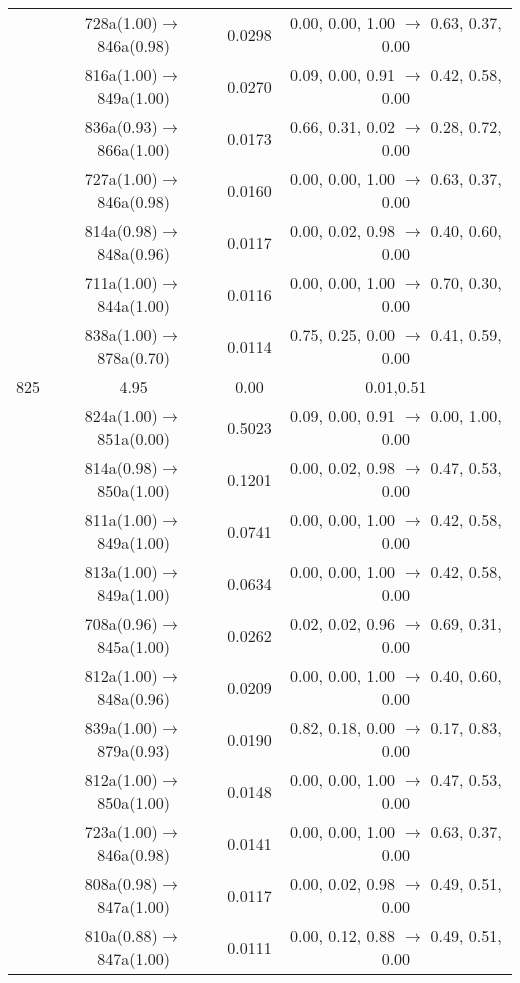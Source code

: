 \documentclass[10pt,a4paper]{article}
\begin{document}
\begin{longtable}{c|c|c|c}
 	& 728a(1.00)$\rightarrow$846a(0.98) &	 0.0298 &	 0.00, 0.00, 1.00 $\rightarrow$ 0.63, 0.37, 0.00 \\ 
 	& 816a(1.00)$\rightarrow$849a(1.00) &	 0.0270 &	 0.09, 0.00, 0.91 $\rightarrow$ 0.42, 0.58, 0.00 \\ 
 	& 836a(0.93)$\rightarrow$866a(1.00) &	 0.0173 &	 0.66, 0.31, 0.02 $\rightarrow$ 0.28, 0.72, 0.00 \\ 
 	& 727a(1.00)$\rightarrow$846a(0.98) &	 0.0160 &	 0.00, 0.00, 1.00 $\rightarrow$ 0.63, 0.37, 0.00 \\ 
 	& 814a(0.98)$\rightarrow$848a(0.96) &	 0.0117 &	 0.00, 0.02, 0.98 $\rightarrow$ 0.40, 0.60, 0.00 \\ 
 	& 711a(1.00)$\rightarrow$844a(1.00) &	 0.0116 &	 0.00, 0.00, 1.00 $\rightarrow$ 0.70, 0.30, 0.00 \\ 
 	& 838a(1.00)$\rightarrow$878a(0.70) &	 0.0114 &	 0.75, 0.25, 0.00 $\rightarrow$ 0.41, 0.59, 0.00 \\ 
 \hline825 &	 4.95 &	 0.00 &	 0.01,0.51 \\ 
  	& 824a(1.00)$\rightarrow$851a(0.00) &	 0.5023 &	 0.09, 0.00, 0.91 $\rightarrow$ 0.00, 1.00, 0.00 \\ 
 	& 814a(0.98)$\rightarrow$850a(1.00) &	 0.1201 &	 0.00, 0.02, 0.98 $\rightarrow$ 0.47, 0.53, 0.00 \\ 
 	& 811a(1.00)$\rightarrow$849a(1.00) &	 0.0741 &	 0.00, 0.00, 1.00 $\rightarrow$ 0.42, 0.58, 0.00 \\ 
 	& 813a(1.00)$\rightarrow$849a(1.00) &	 0.0634 &	 0.00, 0.00, 1.00 $\rightarrow$ 0.42, 0.58, 0.00 \\ 
 	& 708a(0.96)$\rightarrow$845a(1.00) &	 0.0262 &	 0.02, 0.02, 0.96 $\rightarrow$ 0.69, 0.31, 0.00 \\ 
 	& 812a(1.00)$\rightarrow$848a(0.96) &	 0.0209 &	 0.00, 0.00, 1.00 $\rightarrow$ 0.40, 0.60, 0.00 \\ 
 	& 839a(1.00)$\rightarrow$879a(0.93) &	 0.0190 &	 0.82, 0.18, 0.00 $\rightarrow$ 0.17, 0.83, 0.00 \\ 
 	& 812a(1.00)$\rightarrow$850a(1.00) &	 0.0148 &	 0.00, 0.00, 1.00 $\rightarrow$ 0.47, 0.53, 0.00 \\ 
 	& 723a(1.00)$\rightarrow$846a(0.98) &	 0.0141 &	 0.00, 0.00, 1.00 $\rightarrow$ 0.63, 0.37, 0.00 \\ 
 	& 808a(0.98)$\rightarrow$847a(1.00) &	 0.0117 &	 0.00, 0.02, 0.98 $\rightarrow$ 0.49, 0.51, 0.00 \\ 
 	& 810a(0.88)$\rightarrow$847a(1.00) &	 0.0111 &	 0.00, 0.12, 0.88 $\rightarrow$ 0.49, 0.51, 0.00 \\ 

\end{longtable}
\end{document}
